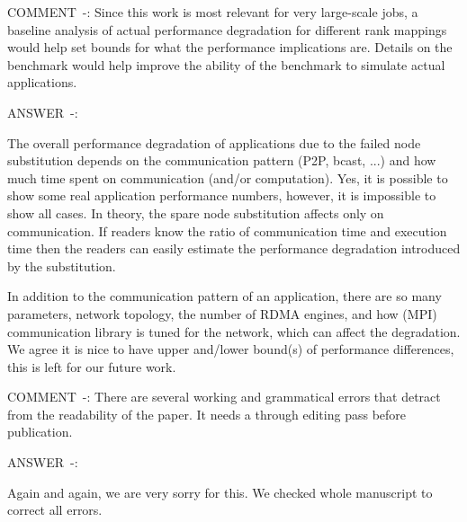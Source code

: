\documentclass[]{letter}
\newcounter{reviewer}
\newcounter{commentno}[reviewer]
\newcommand{\REVIEW}[2]{
\stepcounter{commentno}
\begin{description}
\item{COMMENT~\thereviewer-\thecommentno: }
#1%
\item{ANSWER~\thereviewer-\thecommentno: }
#2%
\end{description}
\vspace{3mm}
}
\begin{document}
\begin{description}
\REVIEW{Since this work is most relevant for very
large-scale jobs, a baseline analysis of actual performance
degradation for different rank mappings would help set bounds for what
the performance implications are. Details on the benchmark would help
improve the ability of the benchmark to simulate actual
applications. }
{
The overall performance degradation of applications due to the failed
node substitution depends on the communication pattern (P2P, bcast,
...) and how much time spent on communication (and/or
computation). Yes, it is possible to show some real application
performance numbers, however, it is impossible to show all cases. In
theory, the spare node substitution affects only on communication. If
readers know the ratio of communication time and execution time then
the readers can easily estimate the performance degradation introduced
by the substitution. 

In addition to the communication pattern of an application, there are
so many parameters, network topology, the number of RDMA engines, and 
how (MPI) communication library is tuned for the network, which can
affect the degradation. We agree it is nice to have upper and/lower bound(s) of
performance differences, this is left for our future work.
}

\REVIEW{There are several working and grammatical errors that
detract from the readability of the paper. It needs a through editing
pass before publication. }
{
Again and again, we are very sorry for this. We checked whole
manuscript to correct all errors.
}

\end{description}
\end{document}
